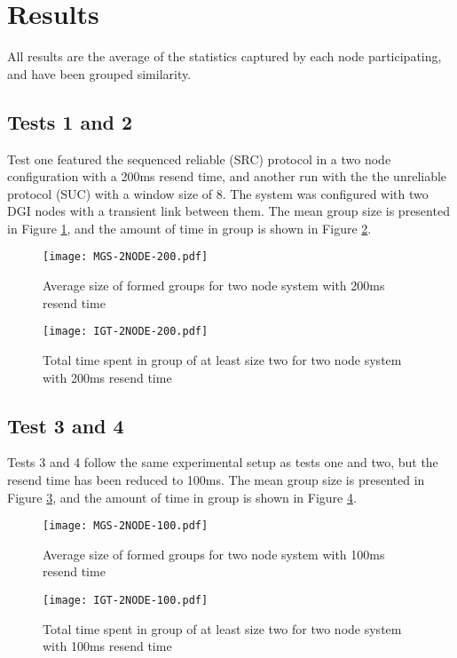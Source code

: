 \section{Results}

All results are the average of the statistics captured by each node participating, and have been grouped similarity.

\subsection{Tests 1 and 2}
Test one featured the sequenced reliable (SRC) protocol in a two node configuration with a 200ms resend time, and another run with the
the unreliable protocol (SUC) with a window size of 8. The system was configured with two DGI nodes with a transient link between them.
The mean group size is presented in Figure \ref{fig:MGS-2NODE-200}, and the amount of time in group is shown in Figure \ref{fig:IGT-2NODE-200}.

\begin{figure}[!h]
\centering
\texttt{[image: MGS-2NODE-200.pdf]}
\caption{Average size of formed groups for two node system with 200ms resend time}
\label{fig:MGS-2NODE-200}
\end{figure}

\begin{figure}[!h]
\centering
\texttt{[image: IGT-2NODE-200.pdf]}
\caption{Total time spent in group of at least size two for two node system with 200ms resend time}
\label{fig:IGT-2NODE-200}
\end{figure}

\subsection{Test 3 and 4}

Tests 3 and 4 follow the same experimental setup as tests one and two, but the resend time has been reduced to 100ms.
The mean group size is presented in Figure \ref{fig:MGS-2NODE-100}, and the amount of time in group is shown in Figure \ref{fig:IGT-2NODE-100}.

\begin{figure}[!h]
\centering
\texttt{[image: MGS-2NODE-100.pdf]}
\caption{Average size of formed groups for two node system with 100ms resend time}
\label{fig:MGS-2NODE-100}
\end{figure}

\begin{figure}[!h]
\centering
\texttt{[image: IGT-2NODE-100.pdf]}
\caption{Total time spent in group of at least size two for two node system with 100ms resend time}
\label{fig:IGT-2NODE-100}
\end{figure}


